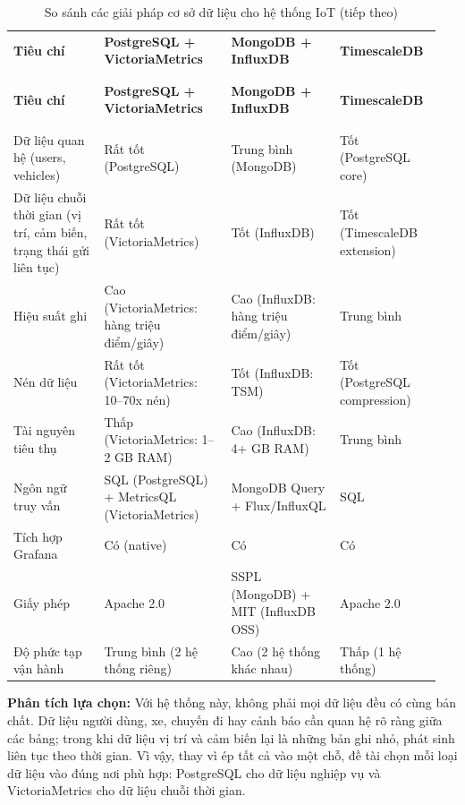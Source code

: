 \documentclass[a4paper]{extarticle}
\newcommand{\thesissettableid}[2]{%
  \renewcommand{\thetable}{#1}%
  \renewcommand{\theHtable}{#2}%
}
\begin{document}
{\thesissettableid{2.4}{tab-ch2-iot-database-solutions}
\def\LTcaptype{table}
\begin{longtable}{|L{0.203\linewidth}|L{0.285\linewidth}|L{0.240\linewidth}|L{0.226\linewidth}|}
\caption{So sánh các giải pháp cơ sở dữ liệu cho hệ thống IoT}\label{tab:ch2-iot-database-solutions}\\
\hline \textbf{Tiêu chí} & \textbf{PostgreSQL + VictoriaMetrics} & \textbf{MongoDB + InfluxDB} & \textbf{TimescaleDB} \\
\\\hline
\endfirsthead
\caption[]{So sánh các giải pháp cơ sở dữ liệu cho hệ thống IoT (tiếp theo)}\\
\hline \textbf{Tiêu chí} & \textbf{PostgreSQL + VictoriaMetrics} & \textbf{MongoDB + InfluxDB} & \textbf{TimescaleDB} \\
\\\hline
\endhead
\\\hline
\endfoot
\endlastfoot
Dữ liệu quan hệ (users, vehicles) & Rất tốt (PostgreSQL) & Trung bình
(MongoDB) & Tốt (PostgreSQL core) \\\hline
Dữ liệu chuỗi thời gian (vị trí, cảm biến, trạng thái gửi liên tục) & Rất tốt (VictoriaMetrics) & Tốt
(InfluxDB) & Tốt (TimescaleDB extension) \\\hline
Hiệu suất ghi & Cao (VictoriaMetrics: hàng triệu điểm/giây) & Cao (InfluxDB:
hàng triệu điểm/giây) & Trung bình \\\hline
Nén dữ liệu & Rất tốt (VictoriaMetrics: 10--70x nén) & Tốt (InfluxDB: TSM) & Tốt
(PostgreSQL compression) \\\hline
Tài nguyên tiêu thụ & Thấp (VictoriaMetrics: 1--2 GB RAM) & Cao (InfluxDB: 4+ GB RAM)
& Trung bình \\\hline
Ngôn ngữ truy vấn & SQL (PostgreSQL) + MetricsQL (VictoriaMetrics) & MongoDB Query +
Flux/InfluxQL & SQL \\\hline
Tích hợp Grafana & Có (native) & Có & Có \\\hline
Giấy phép & Apache 2.0 & SSPL (MongoDB) + MIT (InfluxDB OSS) & Apache
2.0 \\\hline
Độ phức tạp vận hành & Trung bình (2 hệ thống riêng) & Cao (2 hệ thống
khác nhau) & Thấp (1 hệ thống) \\\hline
\end{longtable}
}

\textbf{Phân tích lựa chọn:} Với hệ thống này, không phải mọi dữ liệu
đều có cùng bản chất. Dữ liệu người dùng, xe, chuyến đi hay cảnh báo cần
quan hệ rõ ràng giữa các bảng; trong khi dữ liệu vị trí và cảm biến lại
là những bản ghi nhỏ, phát sinh liên tục theo thời gian. Vì vậy, thay vì
ép tất cả vào một chỗ, đề tài chọn mỗi loại dữ liệu vào đúng nơi phù
hợp: PostgreSQL cho dữ liệu nghiệp vụ và VictoriaMetrics cho dữ liệu
chuỗi thời gian.
\end{document}
